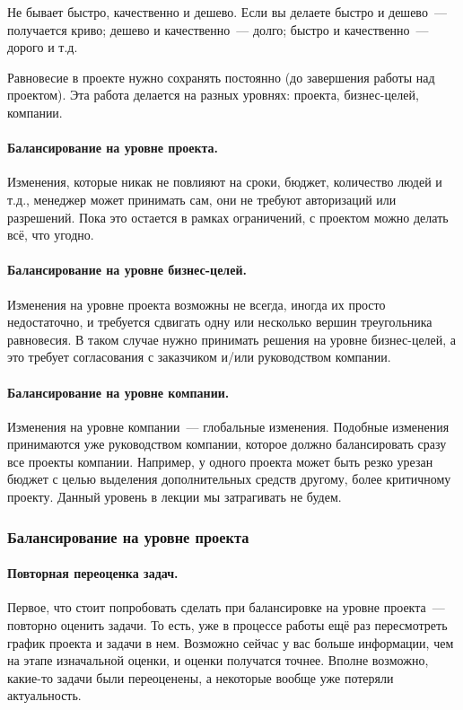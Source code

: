 \documentclass{../../text-style}
\begin{document}
Не бывает быстро, качественно и дешево. Если вы делаете быстро и дешево~--- получается криво; дешево и качественно~--- долго; быстро и качественно~--- дорого и т.д.

Равновесие в проекте нужно сохранять постоянно (до завершения работы над проектом). Эта работа делается на разных уровнях: проекта, бизнес-целей, компании.

\paragraph{Балансирование на уровне проекта.} Изменения, которые никак не повлияют на сроки, бюджет, количество людей и т.д., менеджер может принимать сам, они не требуют авторизаций или разрешений. Пока это остается в рамках ограничений, с проектом можно делать всё, что угодно.

\paragraph{Балансирование на уровне бизнес-целей.} Изменения на уровне проекта возможны не всегда, иногда их просто недостаточно, и требуется сдвигать одну или несколько вершин треугольника равновесия. В таком случае нужно принимать решения на уровне бизнес-целей, а это требует согласования с заказчиком и/или руководством компании.

\paragraph{Балансирование на уровне компании.} Изменения на уровне компании~--- глобальные изменения. Подобные изменения принимаются уже руководством компании, которое должно балансировать сразу все проекты компании. Например, у одного проекта может быть резко урезан бюджет с целью выделения дополнительных средств другому, более критичному проекту. Данный уровень в лекции мы затрагивать не будем.

\subsubsection{Балансирование на уровне проекта}

\paragraph{Повторная переоценка задач.} Первое, что стоит попробовать сделать при балансировке на уровне проекта~--- повторно оценить задачи. То есть, уже в процессе работы ещё раз пересмотреть график проекта и задачи в нем. Возможно сейчас у вас больше информации, чем на этапе изначальной оценки, и оценки получатся точнее. Вполне возможно, какие-то задачи были переоценены, а некоторые вообще уже потеряли актуальность.
\end{document}

